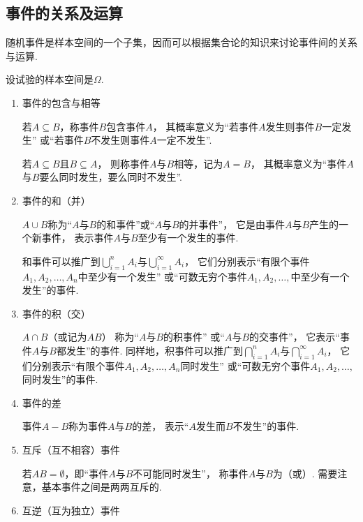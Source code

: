 \subsection{事件的关系及运算}
随机事件是样本空间的一个子集，因而可以根据集合论的知识来讨论事件间的关系与运算.

\begin{definition}
设试验的样本空间是\(\Omega\).

\begin{enumerate}
	\item 事件的包含与相等

	若\(A \subseteq B\)，称事件\(B\)包含事件\(A\)，
	其概率意义为“若事件\(A\)发生则事件\(B\)一定发生”
	或“若事件\(B\)不发生则事件\(A\)一定不发生”.

	若\(A \subseteq B\)且\(B \subseteq A\)，
	则称事件\(A\)与\(B\)相等，记为\(A = B\)，
	其概率意义为“事件\(A\)与\(B\)要么同时发生，要么同时不发生”.

	\item 事件的和（并）

	\(A \cup B\)称为“\(A\)与\(B\)的和事件”或“\(A\)与\(B\)的并事件”，
	它是由事件\(A\)与\(B\)产生的一个新事件，
	表示事件\(A\)与\(B\)至少有一个发生的事件.

	和事件可以推广到\(\bigcup_{i=1}^n A_i\)与\(\bigcup_{i=1}^\infty A_i\)，
	它们分别表示“有限个事件\(A_1,A_2,\dotsc,A_n\)中至少有一个发生”
	或“可数无穷个事件\(A_1,A_2,\dotsc,\)中至少有一个发生”的事件.

	\item 事件的积（交）

	\(A \cap B\)（或记为\(AB\)）
	称为“\(A\)与\(B\)的积事件”
	或“\(A\)与\(B\)的交事件”，
	它表示“事件\(A\)与\(B\)都发生”的事件.
	同样地，积事件可以推广到\(\bigcap_{i=1}^n A_i\)与\(\bigcap_{i=1}^\infty A_i\)，
	它们分别表示“有限个事件\(A_1,A_2,\dotsc,A_n\)同时发生”
	或“可数无穷个事件\(A_1,A_2,\dotsc,\)同时发生”的事件.

	\item 事件的差

	事件\(A-B\)称为事件\(A\)与\(B\)的差，
	表示“\(A\)发生而\(B\)不发生”的事件.

	\item 互斥（互不相容）事件

	若\(AB = \emptyset\)，即“事件\(A\)与\(B\)不可能同时发生”，
	称事件\(A\)与\(B\)为（或）.
	需要注意，基本事件之间是两两互斥的.

	\item 互逆（互为独立）事件


\end{enumerate}
\end{definition}
